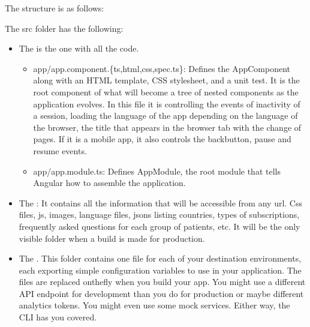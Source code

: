\documentclass[letterpaper,10pt,english]{sphinxmanual}
\begin{document}
The structure is as follows:



The src folder has the following:
\begin{itemize}
\item {} 
The  is the one with all the code.
\begin{itemize}
\item {} 
app/app.component.\{ts,html,css,spec.ts\}: Defines the AppComponent along with an HTML template, CSS stylesheet, and a unit test. It is the root component of what will become a tree of nested components as the application evolves. In this file it is controlling the events of inactivity of a session, loading the language of the app depending on the language of the browser, the title that appears in the browser tab with the change of pages. If it is a mobile app, it also controls the backbutton, pause and resume events.

\item {} 
app/app.module.ts: Defines AppModule, the root module that tells Angular how to assemble the application.

\end{itemize}

\item {} 
The : It contains all the information that will be accessible from any url. Css files, js, images, language files, jsons listing countries, types of subscriptions, frequently asked questions for each group of patients, etc. It will be the only visible folder when a build is made for production.

\item {} 
The . This folder contains one file for each of your destination environments, each exporting simple configuration variables to use in your application. The files are replaced on\sphinxhyphen{}the\sphinxhyphen{}fly when you build your app. You might use a different API endpoint for development than you do for production or maybe different analytics tokens. You might even use some mock services. Either way, the CLI has you covered.

\end{itemize}
\end{document}
